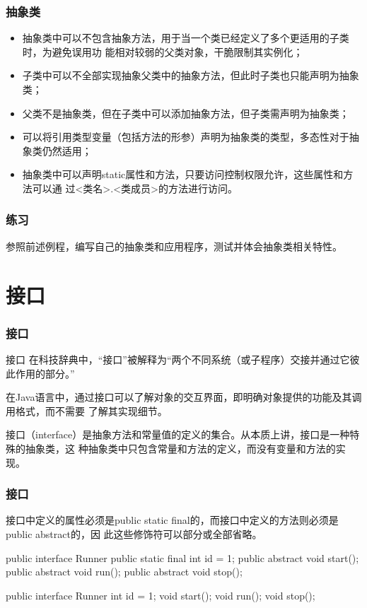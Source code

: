 \begin{frame}[fragile] %
\frametitle{抽象类}
\begin{itemize}[<+-| alert@+>]
\item 抽象类中可以不包含抽象方法，用于当一个类已经定义了多个更适用的子类时，为避免误用功
  能相对较弱的父类对象，干脆限制其实例化；
\item 子类中可以不全部实现抽象父类中的抽象方法，但此时子类也只能声明为抽象类；
\item 父类不是抽象类，但在子类中可以添加抽象方法，但子类需声明为抽象类；
\item 可以将引用类型变量（包括方法的形参）声明为抽象类的类型，多态性对于抽象类仍然适用；
\item 抽象类中可以声明static属性和方法，只要访问控制权限允许，这些属性和方法可以通
  过{\msyh \small <类名>.<类成员>}的方法进行访问。
\end{itemize}
\end{frame}

\begin{frame}[fragile] %
\frametitle{练习}

参照前述例程，编写自己的抽象类和应用程序，测试并体会抽象类相关特性。
\end{frame}

\section{接口}
\begin{frame}[fragile] %
\frametitle{接口}

\begin{block}{接口}
  在科技辞典中，“接口”被解释为“两个不同系统（或子程序）交接并通过它彼此作用的部分。”
\end{block}
在Java语言中，通过接口可以了解对象的交互界面，即明确对象提供的功能及其调用格式，而不需要
了解其实现细节。

接口（interface）是抽象方法和常量值的定义的集合。从本质上讲，接口是一种特殊的抽象类，这
种抽象类中只包含常量和方法的定义，而没有变量和方法的实现。
\end{frame}

\begin{frame}[fragile] %
\frametitle{接口}

接口中定义的属性必须是public static final的，而接口中定义的方法则必须是public abstract的，因
此这些修饰符可以部分或全部省略。 

\begin{javaCode}
public interface Runner {
  public static final int id = 1;
  public abstract void start();
  public abstract void run();
  public abstract void stop();
}
\end{javaCode}

\begin{javaCode}
public interface Runner {
  int id = 1;
  void start();
  void run();
  void stop();
}
\end{javaCode}
\end{frame}

